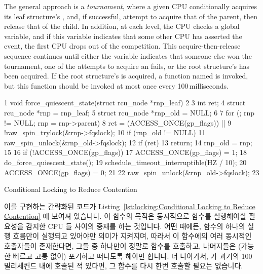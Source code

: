 The general approach is a \emph{tournament}, where
a given CPU conditionally acquires its
leaf  structure's , and, if successful,
attempt to acquire that of the parent, then release that of the child.
In addition, at each level, the CPU checks a global 
variable, and if this variable indicates that some other CPU has
asserted the event, the first CPU drops out of the competition.
This acquire-then-release sequence continues until either the
 variable indicates that someone else won the tournament,
one of the attempts to acquire an  fails, or
the root  structure's  has been acquired.
If the root  structure's  is acquired,
a function named  is invoked, but this
function should be invoked at most once every 100\,milliseconds.
\fi

\begin{listing}[tbp]
{ \scriptsize
\begin{verbbox}
 1  void force_quiescent_state(struct rcu_node *rnp_leaf)
 2  {
 3    int ret;
 4    struct rcu_node *rnp = rnp_leaf;
 5    struct rcu_node *rnp_old = NULL;
 6
 7    for (; rnp != NULL; rnp = rnp->parent) {
 8      ret = (ACCESS_ONCE(gp_flags)) ||
 9            !raw_spin_trylock(&rnp->fqslock);
10      if (rnp_old != NULL)
11        raw_spin_unlock(&rnp_old->fqslock);
12      if (ret)
13        return;
14      rnp_old = rnp;
15    }
16    if (!ACCESS_ONCE(gp_flags)) {
17      ACCESS_ONCE(gp_flags) = 1;
18      do_force_quiescent_state();
19      schedule_timeout_interruptible(HZ / 10);
20      ACCESS_ONCE(gp_flags) = 0;
21    }
22    raw_spin_unlock(&rnp_old->fqslock);
23  }
\end{verbbox}
}
\centering
\theverbbox
\caption{Conditional Locking to Reduce Contention}
\label{lst:locking:Conditional Locking to Reduce Contention}
\end{listing}

이를 구현하는 간략화된 코드가
Listing~\ref{lst:locking:Conditional Locking to Reduce Contention} 에 보여져
있습니다.
이 함수의 목적은 동시적으로  함수를 실행해야할
필요성을 감지한 CPU 들 사이의 중재를 하는 것입니다.
어떤 때에든,  함수의 하나의 실행 흐름만이
실행되고 있어야만 의미가 지켜지며, 따라서 이 함수에의 여러 동시적인 호출자들이
존재한다면, 그들 중 하나만이 정말로  함수를
호출하고, 나머지들은 (가능한 빠르고 고통 없이) 포기하고 떠나도록 해야만 합니다.
더 나아가서,  가 과거의 100\,밀리세컨드 내에
호출된 적 있다면, 그 함수를 다시 한번 호출할 필요는 없습니다.
\iffalse

